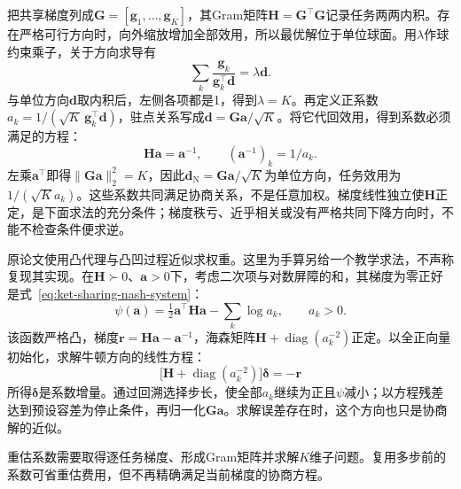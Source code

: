 把共享梯度列成$\bm G=[\bm g_1,\ldots,\bm g_K]$，其Gram矩阵$\bm H=\bm G^{\top}\bm G$记录任务两两内积。存在严格可行方向时，向外缩放增加全部效用，所以最优解位于单位球面。用$\lambda$作球约束乘子，关于方向求导有
\begin{equation}
  \sum_k\frac{\bm g_k}{\bm g_k^{\top}\bm d}
  =\lambda\bm d.
\end{equation}
与单位方向$\bm d$取内积后，左侧各项都是1，得到$\lambda=K$。再定义正系数$a_k=1/(\sqrt K\,\bm g_k^{\top}\bm d)$，驻点关系写成$\bm d=\bm G\bm a/\sqrt K$。将它代回效用，得到系数必须满足的方程：
\begin{equation}
  \bm H\bm a=\bm a^{-1},
  \qquad
  (\bm a^{-1})_k=1/a_k.
  \label{eq:ket-sharing-nash-system}
\end{equation}
左乘$\bm a^{\top}$即得$\|\bm G\bm a\|_2^2=K$，因此$\bm d_{\mathrm N}=\bm G\bm a/\sqrt K$为单位方向，任务效用为$1/(\sqrt K a_k)$。这些系数共同满足协商关系，不是任意加权。梯度线性独立使$\bm H$正定，是下面求法的充分条件；梯度秩亏、近乎相关或没有严格共同下降方向时，不能不检查条件便求逆。

原论文使用凸代理与凸凹过程近似求权重。这里为手算另给一个教学求法，不声称复现其实现。在$\bm H\succ0$、$\bm a>0$下，考虑二次项与对数屏障的和，其梯度为零正好是式~\eqref{eq:ket-sharing-nash-system}：
\begin{equation}
  \psi(\bm a)
  =\tfrac12\bm a^{\top}\bm H\bm a
   -\sum_k\log a_k,
  \qquad a_k>0.
  \label{eq:ket-sharing-nash-newton}
\end{equation}
该函数严格凸，梯度$\bm r=\bm H\bm a-\bm a^{-1}$，海森矩阵$\bm H+\operatorname{diag}(a_k^{-2})$正定。以全正向量初始化，求解牛顿方向的线性方程：
\[
  \bigl[\bm H+\operatorname{diag}(a_k^{-2})\bigr]
  \bm\delta=-\bm r
\]
所得$\bm\delta$是系数增量。通过回溯选择步长，使全部$a_k$继续为正且$\psi$减小；以方程残差达到预设容差为停止条件，再归一化$\bm G\bm a$。求解误差存在时，这个方向也只是协商解的近似。

重估系数需要取得逐任务梯度、形成Gram矩阵并求解$K$维子问题。复用多步前的系数可省重估费用，但不再精确满足当前梯度的协商方程。

